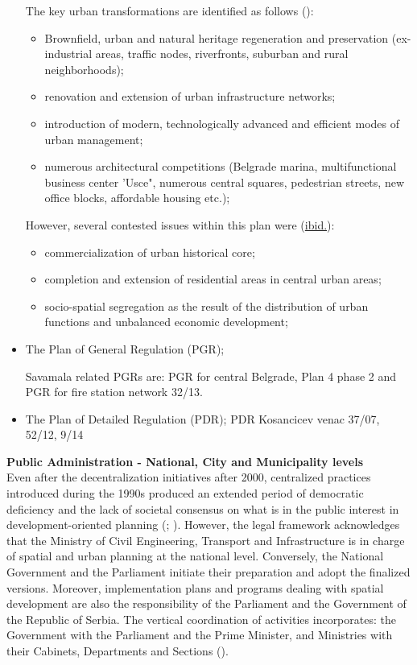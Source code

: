 \documentclass[11pt]{report}
\begin{document}
\begin{itemize}
The key urban transformations are identified as follows (\href{Stupar}{\citealt{stupar_aleksandra_recreating_2004}}):
\begin{itemize}
\item Brownfield, urban and natural heritage regeneration and preservation (ex-industrial  areas,  traffic  nodes, riverfronts,  suburban  and  rural neighborhoods);
\item renovation and extension of urban infrastructure networks;
\item introduction  of  modern, technologically  advanced  and  efficient  modes  of  urban management;
\item numerous  architectural  competitions (Belgrade marina, multifunctional business center 'Usce", numerous central squares, pedestrian streets, new office blocks, affordable housing etc.);
\end{itemize}

However, several contested issues within this plan were (\href{ref}{ibid.}):
\begin{itemize}
\item commercialization  of  urban  historical core;
\item completion and extension of residential  areas in central urban areas;
\item socio-spatial segregation as the result of the distribution of urban functions and unbalanced economic development;
\end{itemize}

\item The Plan of General Regulation (PGR);

Savamala related PGRs are: PGR for central Belgrade, Plan 4 phase 2 and PGR for fire station network 32/13.
\item The Plan of Detailed Regulation (PDR);
PDR Kosancicev venac 37/07, 52/12, 9/14
\end{itemize}

\textbf{Public Administration - National, City and Municipality levels}
\\
Even after the decentralization initiatives after 2000, centralized practices introduced during the 1990s produced an extended period of democratic deficiency and the lack of societal consensus on what is in the public interest in development-oriented planning (\href{Vujosevic}{\citealt{vujosevic_racionalnost_2004}}; \href{Vujosevic}{\citealt{vujosevic_collapse_2010}}).
However, the legal framework acknowledges that the Ministry of Civil Engineering, Transport and Infrastructure is in charge of spatial and urban planning at the national level.
Conversely, the National Government and the Parliament initiate their preparation and adopt the finalized versions.
Moreover, implementation plans and programs dealing with spatial development are also the responsibility of the Parliament and the Government of the Republic of Serbia.
The vertical coordination of activities incorporates: the Government with the Parliament and the Prime Minister, and Ministries with their Cabinets, Departments and Sections (\href{Stojkov}{\citealt{stojkov_prostorno_2012}}).
\\
\end{document}
